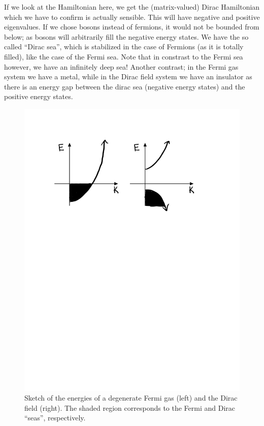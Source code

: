 If we look at the Hamiltonian here, we get the (matrix-valued) Dirac Hamiltonian which we have to confirm is actually sensible. This will have negative and positive eigenvalues. If we chose bosons instead of fermions, it would not be bounded from below; as bosons will arbitrarily fill the negative energy states. We have the so called ``Dirac sea'', which is stabilized in the case of Fermions (as it is totally filled), like the case of the Fermi sea. Note that in constrast to the Fermi sea however, we have an infinitely deep sea! Another contrast; in the Fermi gas system we have a metal, while in the Dirac field system we have an insulator as there is an energy gap between the dirac sea (negative energy states) and the positive energy states.

\begin{figure}[htbp]
    \centering
    \includegraphics[scale=0.7]{Images/fig-fermidiracseas.pdf}
    \caption{Sketch of the energies of a degenerate Fermi gas (left) and the Dirac field (right). The shaded region corresponds to the Fermi and Dirac ``seas'', respectively.}
    \label{fig-fermidiracseas}
\end{figure}

